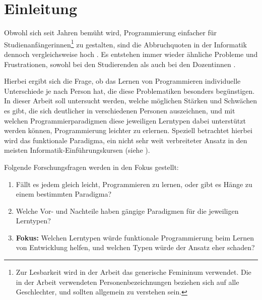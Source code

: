 \clearpage
\section{Einleitung}
\label{sec:intro}

Obwohl sich seit Jahren bemüht wird, Programmierung einfacher für Studienanfängerinnen\footnote{Zur Lesbarkeit wird in der Arbeit das generische Femininum verwendet. Die in der Arbeit verwendeten Personenbezeichnungen beziehen sich auf alle Geschlechter, und sollten allgemein zu verstehen sein.} zu gestalten, sind die Abbruchquoten in der Informatik dennoch vergleichsweise hoch \cite{dhzw}.
Es entstehen immer wieder ähnliche Probleme und Frustrationen, sowohl bei den Studierenden als auch bei den Dozentinnen \cite{mcdonald}.

Hierbei ergibt sich die Frage, ob das Lernen von Programmieren individuelle Unterschiede je nach Person hat, die diese Problematiken besonders begünstigen. In dieser Arbeit soll untersucht werden, welche möglichen Stärken und Schwächen es gibt, die sich deutlicher in verschiedenen Personen auszeichnen, und mit welchen Programmierparadigmen diese jeweiligen Lerntypen dabei unterstützt werden können, Programmierung leichter zu erlernen.
Speziell betrachtet hierbei wird das funktionale Paradigma, ein nicht sehr weit verbreiteter Ansatz in den meisten Informatik-Einführungskursen (siehe ).

Folgende Forschungsfragen werden in den Fokus gestellt:

\begin{enumerate}
    \item Fällt es jedem gleich leicht, Programmieren zu lernen, oder gibt es Hänge zu einem bestimmten Paradigma?
    \item Welche Vor- und Nachteile haben gängige Paradigmen für die jeweiligen Lerntypen?
    \item \textbf{Fokus:} Welchen Lerntypen würde funktionale Programmierung beim Lernen von Entwicklung helfen, und welchen Typen würde der Ansatz eher schaden?
\end{enumerate}

